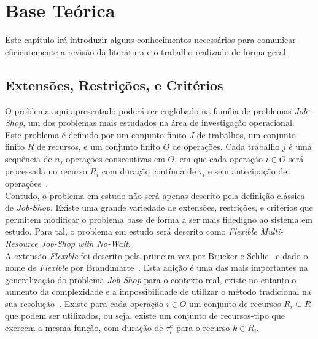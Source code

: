 
%

\chapter{Base Teórica}
\label{cha:base_teórica}


\epigraphfontsize{\small\itshape}
\setlength\epigraphwidth{12.5cm}
\setlength\epigraphrule{0pt}

Este capítulo irá introduzir alguns conhecimentos necessários para comunicar eficientemente a revisão da literatura e o trabalho realizado de forma geral.\\

\section{Extensões, Restrições, e Critérios}
\label{sec:extensões_restrições_critérios}

O problema aqui apresentado poderá ser englobado na família de problemas \textit{Job-Shop}, um dos problemas mais estudados na área de investigação operacional.\\
Este problema é definido por um conjunto finito $J$ de trabalhos, um conjunto finito $R$ de recursos, e um conjunto finito $O$ de operações. Cada trabalho $j$ é uma sequência de $n_{j}$ operações consecutivas em $O$, em que cada operação $i \in O$ será processada no recurso $R_{i}$ com duração contínua de $\tau_{i}$ e sem antecipação de operações~\cite{dauzere-peresFlexibleJobShop2024}.\\
Contudo, o problema em estudo não será apenas descrito pela definição clássica de \textit{Job-Shop}. Existe uma grande variedade de extensões, restrições, e critérios que permitem modificar o problema base de forma a ser mais fidedigno ao sistema em estudo. Para tal, o problema em estudo será descrito como \textit{Flexible Multi-Resource Job-Shop with No-Wait}.\\

A extensão \textit{Flexible} foi descrito pela primeira vez por Brucker e Schlie~\cite{bruckerJobshopSchedulingMultipurpose1990} e dado o nome de \textit{Flexible} por Brandimarte~\cite{brandimarteRoutingSchedulingFlexible1993}. Esta adição é uma das mais importantes na generalização do problema \textit{Job-Shop} para o contexto real, existe no entanto o aumento da complexidade e a impossibilidade de utilizar o método tradicional na sua resolução~\cite{dauzere-peresFlexibleJobShop2024}. Existe para cada operação $i \in O$ um conjunto de recursos $R_{i} \subseteq R$ que podem ser utilizados, ou seja, existe um conjunto de recursos-tipo que exercem a mesma função, com duração de $\tau_{i}^{k}$ para o recurso $k \in R_{i}$.\\

